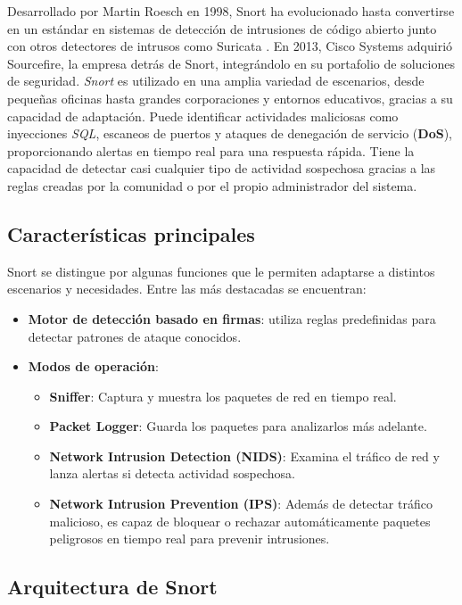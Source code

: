 \documentclass[11pt,a4paper,twoside]{report}
\begin{document}
Desarrollado por Martin Roesch en 1998, Snort ha evolucionado hasta convertirse en un estándar en sistemas de detección de intrusiones de código abierto junto con otros detectores de intrusos como Suricata \cite{suricata_official}. En 2013, Cisco Systems adquirió Sourcefire, la empresa detrás de Snort, integrándolo en su portafolio de soluciones de seguridad. \textit{Snort} es utilizado en una amplia variedad de escenarios, desde pequeñas oficinas hasta grandes corporaciones y entornos educativos, gracias a su capacidad de adaptación. Puede identificar actividades maliciosas como inyecciones \textit{SQL}, escaneos de puertos y ataques de denegación de servicio (\textbf{DoS}), proporcionando alertas en tiempo real para una respuesta rápida. Tiene la capacidad de detectar casi cualquier tipo de actividad sospechosa gracias a las reglas creadas por la comunidad o por el propio administrador del sistema.

\subsection{Características principales}

Snort se distingue por algunas funciones que le permiten adaptarse a distintos escenarios y necesidades. Entre las más destacadas se encuentran:

\begin{itemize}
	\item \textbf{Motor de detección basado en firmas}: utiliza reglas predefinidas para detectar patrones de ataque conocidos.
	
	\item \textbf{Modos de operación}:
	\begin{itemize}
		\item \textbf{Sniffer}: Captura y muestra los paquetes de red en tiempo real.
		\item \textbf{Packet Logger}: Guarda los paquetes para analizarlos más adelante.
		\item \textbf{Network Intrusion Detection (NIDS)}: Examina el tráfico de red y lanza alertas si detecta actividad sospechosa.
		\item \textbf{Network Intrusion Prevention (IPS)}: Además de detectar tráfico malicioso, es capaz de bloquear o rechazar automáticamente paquetes peligrosos en tiempo real para prevenir intrusiones.
	\end{itemize}
\end{itemize}

\subsection{Arquitectura de Snort}
\end{document}
